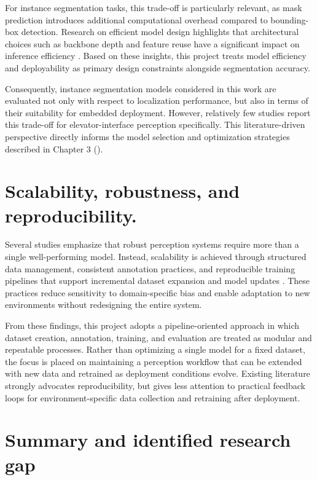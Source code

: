 For instance segmentation tasks, this trade-off is particularly relevant, as mask
prediction introduces additional computational overhead compared to bounding-box
detection. Research on efficient model design highlights that architectural choices
such as backbone depth and feature reuse have a significant impact on inference
efficiency \citep{tan2019efficientnet}. Based on these insights, this project
treats model efficiency and deployability as primary design constraints alongside
segmentation accuracy.

Consequently, instance segmentation models considered in this work are evaluated
not only with respect to localization performance, but also in terms of their
suitability for embedded deployment. However, relatively few studies report this
trade-off for elevator-interface perception specifically. This literature-driven
perspective directly informs the model selection and optimization strategies
described in Chapter 3 ().

\section{Scalability, robustness, and reproducibility.}

Several studies emphasize that robust perception systems require more than a single
well-performing model. Instead, scalability is achieved through structured data
management, consistent annotation practices, and reproducible training pipelines
that support incremental dataset expansion and model updates
\citep{cordts2016cityscapes}. These practices reduce sensitivity to domain-specific
bias and enable adaptation to new environments without redesigning the entire
system.

From these findings, this project adopts a pipeline-oriented approach in which
dataset creation, annotation, training, and evaluation are treated as modular and
repeatable processes. Rather than optimizing a single model for a fixed dataset,
the focus is placed on maintaining a perception workflow that can be extended with
new data and retrained as deployment conditions evolve. Existing literature
strongly advocates reproducibility, but gives less attention to practical
feedback loops for environment-specific data collection and retraining after
deployment.


\section{Summary and identified research gap}

